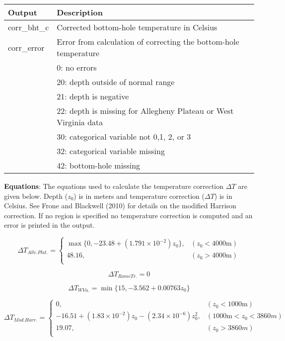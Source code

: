 \documentclass[12pt,a4paper]{article}
\begin{document}
\begin{table}[H]
\begin{tabular} {p{2cm} p{11cm}}
\hline
\textbf{Output} & \textbf{Description}\\
\hline
\textsf{corr\_bht\_c} 	 & Corrected bottom-hole temperature in Celsius \\
\textsf{corr\_error}		 & Error from calculation of correcting the bottom-hole temperature\\
  & 0: no errors\\
  & 20: depth outside of normal range\\
  & 21: depth is negative\\
  & 22: depth is missing for Allegheny Plateau or West Virginia data\\
  & 30: categorical variable not 0,1, 2, or 3\\
  & 32: categorical variable missing\\
  & 42: bottom-hole missing\\
\hline
\end{tabular} 
\end{table}

\textbf{Equations}: The equations used to calculate the temperature correction $\Delta T$ are given below. Depth ($z_0$) is in meters and temperature correction ($\Delta T$) is in Celsius. See Frone and Blackwell (2010) for details on the modified Harrison correction. If no region is specified no temperature correction is computed and an error is printed in the output.

\begin{equation} \label{DT_ap}
{\Delta T}_{Alle. Plat.} =  \left\{
\begin{array}{ll}
\max\{0,-23.48 + (1.791\times 10^{-2})z_0\},	& (z_0 < 4000 \mathrm{m})\\
48.16,  & (z_0 > 4000 \mathrm{m})\\
\end{array} \right .
\end{equation}

\begin{equation} \label{DT_rt}
{\Delta T}_{Rome Tr.} = 0
\end{equation}

\begin{equation} \label{DT_wv}
{\Delta T}_{W Va.} = \min\{15, -3.562+0.00763z_0 \}
\end{equation}

\begin{equation} \label{DT_modhar}
{\Delta T}_{Mod. Harr.} =  \left\{
\begin{array}{ll}
0,	& (z_0 < 1000 \mathrm{m})\\
-16.51 + (1.83\times 10^{-2})z_0 -(2.34\times 10^{-6})z_0^2 ,  & (1000 \mathrm{m} < z_0 < 3860 m)\\
19.07, & (z_0 > 3860 m)\\
\end{array} \right .
\end{equation}
\end{document}
